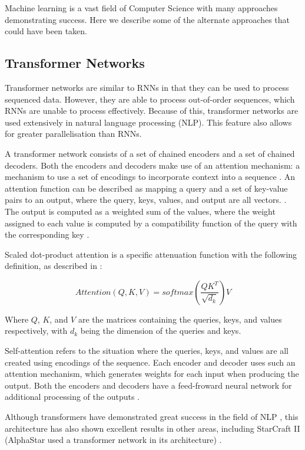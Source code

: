 Machine learning is a vast field of Computer Science with many approaches demonstrating success. Here we describe some of the alternate approaches that could have been taken.

\subsection{Transformer Networks}

Transformer networks are similar to RNNs in that they can be used to process sequenced data. However, they are able to process out-of-order sequences, which RNNs are unable to process effectively. Because of this, transformer networks are used extensively in natural language processing (NLP). This feature also allows for greater parallelisation than RNNs.

A transformer network consists of a set of chained encoders and a set of chained decoders. Both the encoders and decoders make use of an attention mechanism: a mechanism to use a set of encodings to incorporate context into a sequence \cite{illustratedtransformer}. An attention function can be described as mapping a query and a set of key-value pairs to an output, where the query, keys, values, and output are all vectors. \cite{attention}. The output is computed as a weighted sum of the values, where the weight assigned to each value is computed by a compatibility function of the query with the corresponding key \cite{attention}.

Scaled dot-product attention is a specific attenuation function with the following definition, as described in \cite{attention}:

\[
Attention(Q,K,V)=softmax(\frac{QK^T}{\sqrt{d_k}})V
\]

Where $Q$, $K$, and $V$ are the matrices containing the queries, keys, and values respectively, with $d_k$ being the dimension of the queries and keys.

Self-attention refers to the situation where the queries, keys, and values are all created using encodings of the sequence. Each encoder and decoder uses such an attention mechanism, which generates weights for each input when producing the output. Both the encoders and decoders have a feed-froward neural network for additional processing of the outputs \cite{illustratedtransformer}.

Although transformers have demonstrated great success in the field of NLP \cite{attention}, this architecture has also shown excellent results in other areas, including StarCraft II (AlphaStar used a transformer network in its architecture) \cite{alphastar}.


